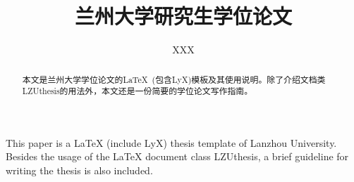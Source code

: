 \documentclass[twoside,longtitle]{LZUthesis}
\begin{document}
\classification{}

\confidential{}

\title{兰州大学研究生学位论文}




\author{XXX}






\submitdate{}


\degreedate{}


\maketitle

\makestatement

\frontmatter{}

\begin{abstract}
本文是兰州大学学位论文的\LaTeX{} (包含LyX)模板及其使用说明。除了介绍文档类LZUthesis的用法外，本文还是一份简要的学位论文写作指南。
\end{abstract}


\begin{englishabstract}
This paper is a \LaTeX{} (include LyX) thesis template of Lanzhou University. Besides the usage of the LaTeX document class LZUthesis, a brief guideline for writing the thesis is also included.
\end{englishabstract}

\end{document}
